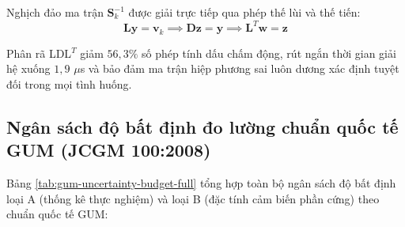 Nghịch đảo ma trận $\mathbf{S}_k^{-1}$ được giải trực tiếp qua phép thế lùi và thế tiến:
\begin{equation}
\mathbf{L} \mathbf{y} = \mathbf{v}_k \implies \mathbf{D} \mathbf{z} = \mathbf{y} \implies \mathbf{L}^T \mathbf{w} = \mathbf{z}
\label{eq:ldlt-forward-backward-substitution}
\end{equation}

\begin{table}[H]
\centering
\caption{So sánh chi phí tính toán và sai số làm tròn giữa nghịch đảo ma trận và phân rã LDL$^T$}
\label{tab:ldlt-numerical-stability-comparison}
\end{table}

Phân rã LDL$^T$ giảm $56{,}3\%$ số phép tính dấu chấm động, rút ngắn thời gian giải hệ xuống $1{,}9$ $\mu$s và bảo đảm ma trận hiệp phương sai luôn dương xác định tuyệt đối trong mọi tình huống.

\subsection{Ngân sách độ bất định đo lường chuẩn quốc tế GUM (JCGM 100:2008)}

\hspace{0.5cm} Bảng \ref{tab:gum-uncertainty-budget-full} tổng hợp toàn bộ ngân sách độ bất định loại A (thống kê thực nghiệm) và loại B (đặc tính cảm biến phần cứng) theo chuẩn quốc tế GUM:

